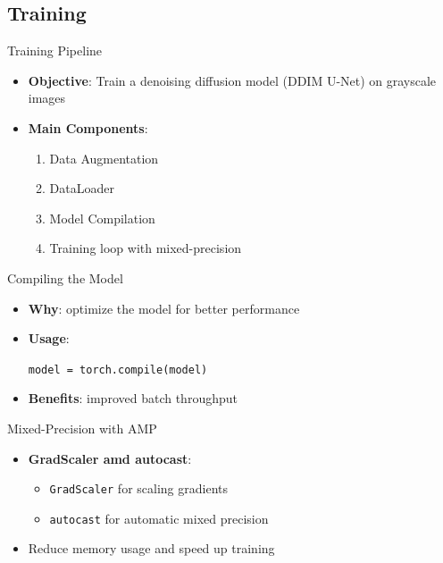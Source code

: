 \subsection{Training}
\begin{frame}{Training Pipeline}
    \begin{itemize}
        \item \textbf{Objective}: Train a denoising diffusion model (DDIM U-Net) on grayscale images
        \item \textbf{Main Components}:
              \begin{enumerate}
                  \item Data Augmentation
                  \item DataLoader
                  \item Model Compilation
                  \item Training loop with mixed-precision
              \end{enumerate}
    \end{itemize}
\end{frame}


\begin{frame}{Compiling the Model}
    \begin{itemize}
        \item \textbf{Why}: optimize the model for better performance
        \item \textbf{Usage}:
              \begin{semiverbatim}
                  \texttt{model = torch.compile(model)}
              \end{semiverbatim}
        \item \textbf{Benefits}: improved batch throughput
    \end{itemize}
\end{frame}


\begin{frame}{Mixed-Precision with AMP}
    \begin{itemize}
        \item \textbf{GradScaler amd autocast}:
              \begin{itemize}
                  \item \texttt{GradScaler} for scaling gradients
                  \item \texttt{autocast} for automatic mixed precision
              \end{itemize}
        \item Reduce memory usage and speed up training
    \end{itemize}
\end{frame}

